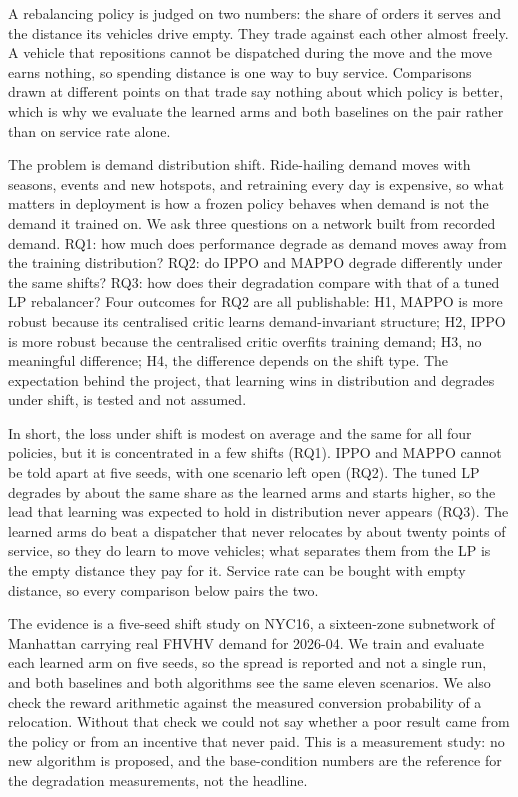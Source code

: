 \documentclass[conference]{IEEEtran}
\begin{document}
A rebalancing policy is judged on two numbers: the share of orders it serves
and the distance its vehicles drive empty. They trade against each other
almost freely. A vehicle that repositions cannot be dispatched during the move
and the move earns nothing, so spending distance is one way to buy service.
Comparisons drawn at different points on that trade say nothing about which
policy is better, which is why we evaluate the learned arms and both baselines
on the pair rather than on service rate alone.

The problem is demand distribution shift. Ride-hailing demand moves with
seasons, events and new hotspots, and retraining every day is expensive, so
what matters in deployment is how a frozen policy behaves when demand is not
the demand it trained on. We ask three questions on a network built from
recorded demand. RQ1: how much does performance degrade as demand moves away
from the training distribution? RQ2: do IPPO and MAPPO degrade differently under
the same shifts? RQ3: how does their degradation compare with that of a tuned
LP rebalancer? Four outcomes for RQ2 are all publishable: H1, MAPPO is more
robust because its centralised critic learns demand-invariant structure; H2,
IPPO is more robust because the centralised critic overfits training demand; H3,
no meaningful difference; H4, the difference depends on the shift type. The
expectation behind the project, that learning wins in distribution and degrades
under shift, is tested and not assumed.

In short, the loss under shift is modest on average and the same for all four
policies, but it is concentrated in a few shifts (RQ1). IPPO and MAPPO cannot be
told apart at five seeds, with one scenario left open (RQ2). The tuned LP
degrades by about the same share as the learned arms and starts higher, so the
lead that learning was expected to hold in distribution never appears (RQ3).
The learned arms do beat a dispatcher that never relocates by about twenty
points of service, so they do learn to move vehicles; what separates them from
the LP is the empty distance they pay for it. Service rate can be bought with
empty distance, so every comparison below pairs the two.

The evidence is a five-seed shift study on NYC16, a sixteen-zone subnetwork of
Manhattan carrying real FHVHV demand for 2026-04. We train and evaluate each
learned arm on five seeds, so the spread is reported and not a single run, and
both baselines and both algorithms see the same eleven scenarios. We also check
the reward arithmetic against the measured conversion probability of a
relocation. Without that check we could not say whether a poor result came from
the policy or from an incentive that never paid. This is a measurement study:
no new algorithm is proposed, and the base-condition numbers are the reference
for the degradation measurements, not the headline.
\end{document}
